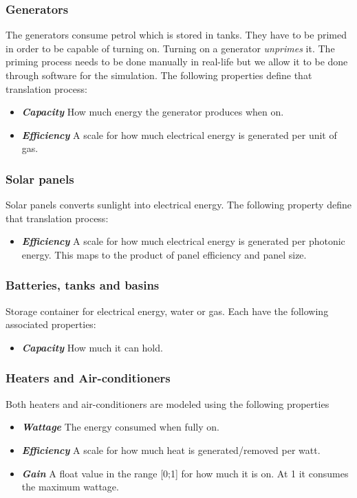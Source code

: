 \documentclass[10pt]{article}
\newcommand{\textdesc}[1]{\textit{\textbf{#1}}} %
\newcommand{\descitem}[1]{\item \textdesc{#1}}
\begin{document}
\subsubsection{Generators}

The generators consume petrol which is stored in tanks. They have to be primed in order to be capable of turning on. Turning on a generator \textsl{unprimes} it. The priming process needs to be done manually in real-life but we allow it to be done through software for the simulation. The following properties define that translation process:
\begin{itemize}
\descitem{Capacity} How much energy the generator produces when on.
\descitem{Efficiency} A scale for how much electrical energy is generated per unit of gas.
\end{itemize}

\subsubsection{Solar panels}

Solar panels converts sunlight into electrical energy. The following property define that translation process:
\begin{itemize}
\descitem{Efficiency} A scale for how much electrical energy is generated per photonic energy. This maps to the product of panel efficiency and panel size.
\end{itemize}

\subsubsection{Batteries, tanks and basins}

Storage container for electrical energy, water or gas. Each have the following associated properties:
\begin{itemize}
\descitem{Capacity} How much it can hold.
\end{itemize}

\subsubsection{Heaters and Air-conditioners}

Both heaters and air-conditioners are modeled using the following properties
\begin{itemize}
  \descitem{Wattage} The energy consumed when fully on.
  \descitem{Efficiency} A scale for how much heat is generated/removed per watt.
  \descitem{Gain} A float value in the range [0;1] for how much it is on. At 1 it consumes the maximum wattage.
\end{itemize}
\end{document}
